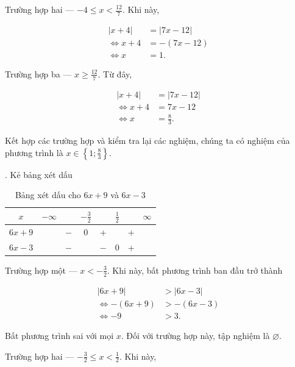 \textcolor{colorEmphasis}{Trường hợp hai --- $-4\leq x < \frac{12}{7} $}. Khi này, 

\begin{align*}
   |x + 4| &= |7x - 12| \\
   \iff x + 4 &= -(7x - 12) \\
   \iff x &= 1.
\end{align*}

\textcolor{colorEmphasisGreen}{Trường hợp ba --- $x \geq \frac{12}{7}$}. Từ đây,

\begin{align*}
   |x + 4| &= |7x - 12| \\
   \iff x + 4 &= 7x - 12 \\
   \iff x &= \frac{8}{3}.
\end{align*}

Kết hợp các trường hợp và kiểm tra lại các nghiệm, chúng ta có nghiệm của phương trình là $x \in \left\{1; \frac{8}{3}\right\}$.

. Kẻ bảng xét dấu

\begin{table}[H]
   \centering
   \begin{tabular}{|c|ccccccc|}
   \hline
   $x$          & $-\infty$ &     & $-\frac{3}{2}$ &     & $\frac{1}{2}$ &   & $\infty$ \\
   \hline
   $6x + 9$        &           & $-$ &  0  &  +  &     & + &           \\
   \hline
   $6x - 3$        &           & $-$ &     & $-$ &  0  & + &           \\
   \hline
   \end{tabular}
   \caption{Bảng xét dấu cho $6x + 9$ và $6x - 3$}
   \label{tab:nen_tang_lo_gich:ham_so_mot_bien:ham_tung_phan:gpt7}
\end{table}

\textcolor{colorEmphasisCyan}{Trường hợp một --- $x < -\frac{3}{2}$}. Khi này, bất phương trình ban đầu trở thành

\begin{align*}
   |6x + 9| &> |6x - 3| \\
   \iff -(6x + 9) &> -(6x - 3) \\
   \iff -9 &> 3.
\end{align*}

Bất phương trình sai với mọi $x$. Đối với trường hợp này, tập nghiệm là $\varnothing$.

\textcolor{colorEmphasis}{Trường hợp hai --- $-\frac{3}{2} \leq x < \frac{1}{2}$}. Khi này,

